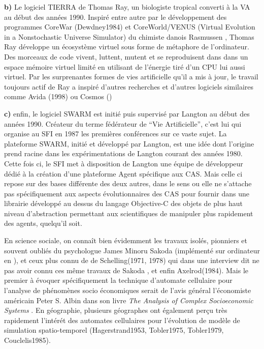 \textbf{b)} Le logiciel TIERRA de Thomas Ray, un biologiste tropical converti à la VA au début des années 1990. Inspiré entre autre par le développement des programmes CoreWar (Dewdney1984) et CoreWorld/VENUS (Virtual Evolution in a Nonstochastic Universe Simulator) du chimiste danois Rasmussen \autocite{Rasmussen1990}, Thomas Ray développe un écosystème virtuel sous forme de métaphore de l'ordinateur. Des morceaux de code vivent, luttent, mutent et se reproduisent dans dans un espace mémoire virtuel limité en utilisant de l'énergie tiré d'un CPU lui aussi virtuel. Par les surprenantes formes de vies artificielle qu'il a mis à jour, le travail toujours actif de Ray a inspiré d'autres recherches et d'autres logiciels similaires comme Avida (1998) ou Cosmos (\autocite{Taylor1999})

\textbf{c)} enfin, le logiciel SWARM \autocite{Minar1996} est initié puis supervisé par Langton au début des années 1990. Créateur du terme fédérateur de \enquote{Vie Artificielle}, c'est lui qui organise au SFI en 1987 les premières conférences sur ce vaste sujet. La plateforme SWARM, initié et développé par Langton, est une idée dont l'origine prend racine dans les expérimentations de Langton courant des années 1980. Cette fois ci, le SFI met à disposition de Langton une équipe de développeur dédié à la création d'une plateforme Agent spécifique aux CAS. Mais celle ci repose sur des bases différente des deux autres, dans le sens ou elle ne s'attache pas spécifiquement aux aspects évolutionnaires des CAS pour fournir dans une librairie développé au dessus du langage Objective-C des objets de plus haut niveau d'abstraction permettant aux scientifiques de manipuler plus rapidement des agents, quelqu'il soit.

En science sociale, on connaît bien évidemment les travaux isolés, pionniers et souvent oubliés \autocites{Hegselmann2012, Aydinonat2007} du psychologue James Minoru Sakoda \autocite{Sakoda1949} (implémenté sur ordinateur en \autocite{Sakoda1971}), et ceux plus connu de de Schelling(1971, 1978) qui dans une interview dit ne pas avoir connu ces même travaux de Sakoda \autocite{Aydinonat2005}, et enfin Axelrod(1984). Mais le premier à évoquer spécifiquement la technique d'automate cellulaire pour l'analyse de phénomènes socio économiques serait de l'avis général l'économiste américain Peter S. Albin dans son livre \textit{The Analysis of Complex Socioeconomic Systems} \textcite{Smith1975, Ganguly2003, Benenson2004, Portugali2000}. En géographie, plusieurs géographes ont également perçu très rapidement l'intérét des automates cellulaires pour l'évolution de modèle de simulation spatio-temporel (Hagerstrand1953, Tobler1975, Tobler1979, Couclelis1985).


